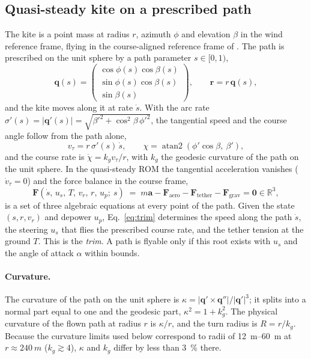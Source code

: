 \documentclass[11pt,a4paper]{article}
\newcommand{\vect}[1]{\boldsymbol{#1}}
\begin{document}
\subsection{Quasi-steady kite on a prescribed path}

The kite is a point mass at radius $r$, azimuth $\phi$ and elevation $\beta$
in the wind reference frame, flying in the course-aligned reference frame of
\cite{cayon2026rom}. The path is prescribed on the unit sphere by a path
parameter $s\in[0,1)$,
\begin{equation}
  \vect q(s) = \begin{pmatrix}\cos\phi(s)\cos\beta(s)\\ \sin\phi(s)\cos\beta(s)\\ \sin\beta(s)\end{pmatrix},
  \qquad \vect r = r\,\vect q(s),
\end{equation}
and the kite moves along it at rate $\dot s$. With the arc rate
$\sigma'(s)=|\vect q'(s)|=\sqrt{\beta'^2+\cos^2\!\beta\,\phi'^2}$, the
tangential speed and the course angle follow from the path alone,
\begin{equation}
  v_\tau = r\,\sigma'(s)\,\dot s, \qquad
  \chi = \operatorname{atan2}\!\left(\phi'\cos\beta,\ \beta'\right),
\end{equation}
and the course rate is $\dot\chi = k_g v_\tau/r$, with $k_g$ the geodesic
curvature of the path on the unit sphere. In the quasi-steady ROM the
tangential acceleration vanishes ($\dot v_\tau=0$) and the force balance in
the course frame,
\begin{equation}
  \vect F(\dot s,\,u_s,\,T,\,v_r,\,r,\,u_p;\ s) \;=\; m\vect a - \vect F_\mathrm{aero} - \vect F_\mathrm{tether} - \vect F_\mathrm{grav} = \vect 0 \in\mathbb R^3,
  \label{eq:trim}
\end{equation}
is a set of three algebraic equations at every point of the path. Given the
state $(s, r, v_r)$ and depower $u_p$, Eq.~\eqref{eq:trim} determines the speed
along the path $\dot s$, the steering $u_s$ that flies the prescribed course
rate, and the tether tension at the ground $T$. This is the \emph{trim}. A
path is flyable only if this root exists with $u_s$ and the angle of attack
$\alpha$ within bounds.

\paragraph{Curvature.}
The curvature of the path on the unit sphere is
$\kappa = |\vect q'\times\vect q''|/|\vect q'|^3$; it splits into a normal part
equal to one and the geodesic part, $\kappa^2 = 1 + k_g^2$. The physical
curvature of the flown path at radius $r$ is $\kappa/r$, and the turn radius is
$R=r/k_g$. Because the curvature limits used below correspond to radii of
\SIrange{12}{60}{m} at $r\approx\SI{240}{m}$ ($k_g\gtrsim 4$), $\kappa$ and
$k_g$ differ by less than \SI{3}{\percent} there.
\end{document}
